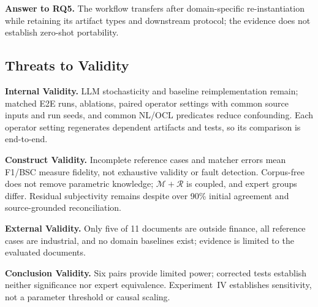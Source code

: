 \noindent\textbf{Answer to RQ5.}
The workflow transfers after domain-specific re-instantiation while retaining
its artifact types and downstream protocol; the evidence does not establish
zero-shot portability.




\subsection{Threats to Validity}

\noindent
\textbf{Internal Validity.}
LLM stochasticity and baseline reimplementation remain; matched E2E runs,
ablations, paired operator settings with common source inputs and run seeds,
and common NL/OCL predicates reduce confounding. Each operator setting
regenerates dependent artifacts and tests, so its comparison is end-to-end.

\noindent
\textbf{Construct Validity.}
Incomplete reference cases and matcher errors mean F1/BSC measure fidelity, not
exhaustive validity or fault detection. Corpus-free does not remove parametric
knowledge; $\mathcal{M}{+}\mathcal{R}$ is coupled, and expert groups differ.
Residual subjectivity remains despite over 90\% initial agreement and
source-grounded reconciliation.

\noindent
\textbf{External Validity.}
Only five of 11 documents are outside finance, all reference cases are industrial, and
no domain baselines exist; evidence is limited to the evaluated documents.

\noindent
\textbf{Conclusion Validity.}
Six pairs provide limited power; corrected tests establish neither significance
nor expert equivalence. Experiment~IV establishes sensitivity, not a parameter
threshold or causal scaling.










